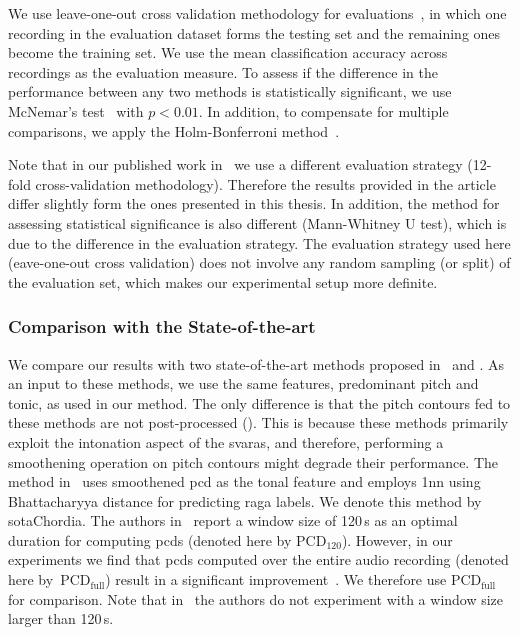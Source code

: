 We use leave-one-out cross validation methodology for evaluations~\citep{Mitchell97BOOK}, in which one recording in the evaluation dataset forms the testing set and the remaining ones become the training set. We use the mean classification accuracy across recordings as the evaluation measure. To assess if the difference in the performance between any two methods is statistically significant, we use McNemar's test~\citep{mcnemar1947note} with $p < 0.01$. In addition, to compensate for multiple comparisons, we apply the Holm-Bonferroni method~\citep{holm1979simple}. 

Note that in our published work in~\cite{gulatiphrase_2016} we use a different evaluation strategy (12-fold cross-validation methodology). Therefore the results provided in the article differ slightly form the ones presented in this thesis. In addition, the method for assessing statistical significance is also different (Mann-Whitney U test), which is due to the difference in the evaluation strategy. The evaluation strategy used here (eave-one-out cross validation) does not involve any random sampling (or split) of the evaluation set, which makes our experimental setup more definite.

\subsubsection{Comparison with the State-of-the-art}
\label{sec:raga_rec_pattern_comparison_sota}

We compare our results with two state-of-the-art methods proposed in~\citep{chordia2013joint} and \citep{koduri2014intonation}. As an input to these methods, we use the same features, predominant pitch and tonic, as used in our method. The only difference is that the pitch contours fed to these methods are not post-processed (). This is because these methods primarily exploit the intonation aspect of the \glspl{svara}, and therefore, performing a smoothening operation on pitch contours might degrade their performance. The method in~\cite{chordia2013joint} uses smoothened \acrfull{pcd} as the tonal feature and employs \acrfull{1nn} using Bhattacharyya distance for predicting \gls{raga} labels. We denote this method by \acrshort{sotaChordia}. The authors in~\cite{chordia2013joint} report a window size of 120\,s as an optimal duration for computing \glspl{pcd} (denoted here by $\mathrm{PCD}_{120}$). However, in our experiments we find that \glspl{pcd} computed over the entire audio recording (denoted here by~$\mathrm{PCD}_\mathrm{full}$) result in a significant improvement~\citep{gulatiphrase_2016}. We therefore use $\mathrm{PCD}_\mathrm{full}$ for comparison. Note that in~\cite{chordia2013joint} the authors do not experiment with a window size larger than 120\,s. 

